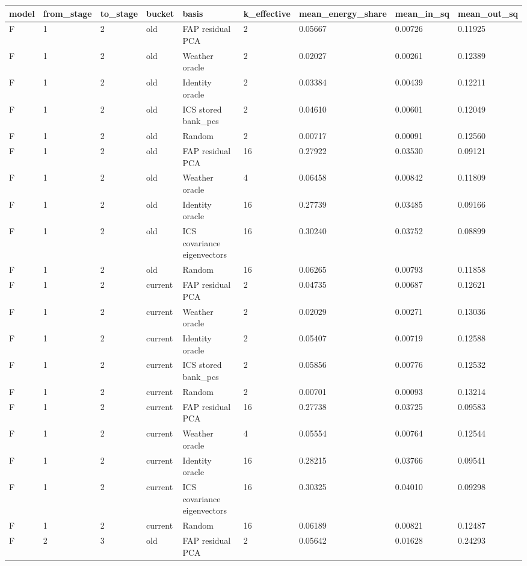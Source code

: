 \begin{tabular}{lllllllll}
\toprule
model & from\_stage & to\_stage & bucket & basis & k\_effective & mean\_energy\_share & mean\_in\_sq & mean\_out\_sq \\
\midrule
F & 1 & 2 & old & FAP residual PCA & 2 & 0.05667 & 0.00726 & 0.11925 \\
F & 1 & 2 & old & Weather oracle & 2 & 0.02027 & 0.00261 & 0.12389 \\
F & 1 & 2 & old & Identity oracle & 2 & 0.03384 & 0.00439 & 0.12211 \\
F & 1 & 2 & old & ICS stored bank\_pcs & 2 & 0.04610 & 0.00601 & 0.12049 \\
F & 1 & 2 & old & Random & 2 & 0.00717 & 0.00091 & 0.12560 \\
F & 1 & 2 & old & FAP residual PCA & 16 & 0.27922 & 0.03530 & 0.09121 \\
F & 1 & 2 & old & Weather oracle & 4 & 0.06458 & 0.00842 & 0.11809 \\
F & 1 & 2 & old & Identity oracle & 16 & 0.27739 & 0.03485 & 0.09166 \\
F & 1 & 2 & old & ICS covariance eigenvectors & 16 & 0.30240 & 0.03752 & 0.08899 \\
F & 1 & 2 & old & Random & 16 & 0.06265 & 0.00793 & 0.11858 \\
F & 1 & 2 & current & FAP residual PCA & 2 & 0.04735 & 0.00687 & 0.12621 \\
F & 1 & 2 & current & Weather oracle & 2 & 0.02029 & 0.00271 & 0.13036 \\
F & 1 & 2 & current & Identity oracle & 2 & 0.05407 & 0.00719 & 0.12588 \\
F & 1 & 2 & current & ICS stored bank\_pcs & 2 & 0.05856 & 0.00776 & 0.12532 \\
F & 1 & 2 & current & Random & 2 & 0.00701 & 0.00093 & 0.13214 \\
F & 1 & 2 & current & FAP residual PCA & 16 & 0.27738 & 0.03725 & 0.09583 \\
F & 1 & 2 & current & Weather oracle & 4 & 0.05554 & 0.00764 & 0.12544 \\
F & 1 & 2 & current & Identity oracle & 16 & 0.28215 & 0.03766 & 0.09541 \\
F & 1 & 2 & current & ICS covariance eigenvectors & 16 & 0.30325 & 0.04010 & 0.09298 \\
F & 1 & 2 & current & Random & 16 & 0.06189 & 0.00821 & 0.12487 \\
F & 2 & 3 & old & FAP residual PCA & 2 & 0.05642 & 0.01628 & 0.24293 \\

\end{tabular}
